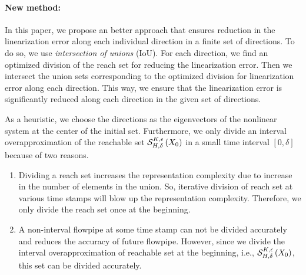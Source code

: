 \paragraph{New method:}  In this paper, we propose an better approach
that ensures reduction in the linearization error along each
individual direction in a finite set of directions.  To do so, we
use \emph{intersection of unions} (IoU).  For each direction, we find
an optimized division of the reach set for reducing the linearization
error.  Then we intersect the union sets corresponding to the
optimized division for linearization error along each direction.  This
way, we ensure that the linearization error is significantly reduced
along each direction in the given set of directions.

As a heuristic, we choose the directions as the eigenvectors of the
nonlinear system at the center of the initial set.  Furthermore, we
only divide an interval overapproximation of the reachable set
$\mathcal{S}_{H,\delta}^{K,\epsilon}\left(X_0\right)$ in a small time interval
$[0,\delta]$ because of two reasons.
%
\begin{enumerate}
\item Dividing a reach set increases the representation complexity due to
increase in the number of elements in the union.  So, iterative
division of reach set at various time stamps will blow up the
representation complexity.  Therefore, we only divide the reach set
once at the beginning.
\item  A non-interval flowpipe at some time stamp can not
be divided accurately and reduces the accuracy of future flowpipe.
However, since we divide the interval overapproximation of reachable
set at the beginning, i.e., $\mathcal{S}_{H,\delta}^{K,\epsilon}\left(X_0\right)$,
this set can be divided accurately.
\end{enumerate}
%
%
